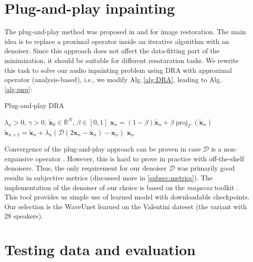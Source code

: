 \documentclass[conference]{IEEEtran}
\begin{document}
\section{Plug-and-play inpainting} \label{sec:plugaandplay}

The plug-and-play method was proposed in \cite{Venkatakrishnan2013} and \cite{Chan2016} for image restoration.
The main idea is to replace a proximal operator inside an iterative algorithm with an denoiser.
Since this approach does not affect the data-fitting part of the minimization, it should be suitable for different resotaration tasks.
We rewrite this task to solve our audio inpainting problem using DRA with approximal operator (analysis-based), i.e., we modify Alg.\,\ref{alg:DRA}, leading to Alg.\,\ref{alg:pnp}:

\vspace{-1.5ex} 
\begin{algorithm}
	\caption{Plug-and-play DRA}
	\begin{algorithmic}[1]\label{alg:pnp}
		\renewcommand{\algorithmicrequire}{\textbf{Input:}}
		\renewcommand{\algorithmicensure}{\textbf{Output:}}
		\REQUIRE $ \lambda_n > 0 $, $ \gamma>0 $, $ \mathbf{\widetilde{x}}_0 \in \mathbb{R}^{N} $, $\beta \in [0, 1]$
		\STATE
		$\mathbf{x}_n= (1-\beta)\mathbf{\widetilde{x}}_n + \beta \operatorname{proj}_{\Gamma}(\mathbf{\widetilde{x}}_n) $ 
		\STATE $ \mathbf{\widetilde{x}}_{n+1} = \mathbf{\widetilde{x}}_n + \lambda_n \left( \mathcal{D} \left(2\mathbf{x}_n-\mathbf{\widetilde{x}}_n \right)-\mathbf{x}_n\right)$
		\ENDFOR
		\RETURN $\mathbf{x}_n$ 
	\end{algorithmic} 
\end{algorithm}
\vspace{-1.5ex} 


Convergence of the plug-and-play approach can be proven in case $\mathcal{D}$ is a non-expansive operator \cite{Chan2016}.
However, this is hard to prove in practice with off-the-shelf denoisers.
Thus, the only requirement for our denoiser $\mathcal{D}$ was primarily good results in subjective metrics
(discussed more in \ref{subsec:metrics}).
The implementation of the denoiser of our choice is based on the \textit{mayavoz} toolkit \cite{Shahul2023}.
This tool provides us simple use of learned model with downloadable checkpoints.
Our selection is the WaveUnet learned on the Valentini dateset \cite{ValentiniBotinhao2017} (the variant with 28 speakers).

\section{Testing data and evaluation}\label{sec:eval}
\end{document}
